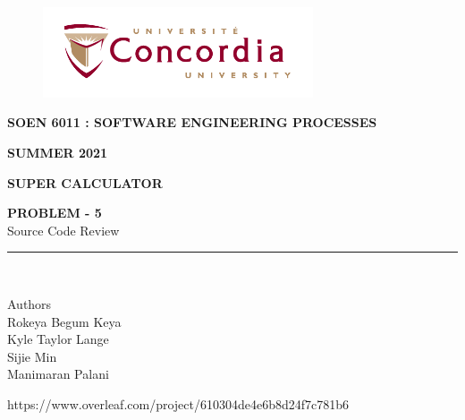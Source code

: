 \documentclass[letterpaper, 11pt]{report}
\begin{document}
\begin{titlepage}
\vspace*{0.7in}
\begin{center}
\begin{figure}[htb]
\begin{center}
\includegraphics[width=8cm]{univ_logo}
\end{center}
\end{figure}
\vspace*{0.3in}
\begin{Large}
\textbf{SOEN 6011 : SOFTWARE ENGINEERING PROCESSES} \\
\end{Large}
\vspace*{0.1in}
\begin{Large}
\textbf{SUMMER 2021} \\
\end{Large}
\vspace*{0.9in}
\begin{Large}
\textbf{SUPER CALCULATOR} \\
\end{Large}
\vspace*{0.9in}
\begin{Large} 


\textbf{PROBLEM - 5} \\
 Source Code Review\\
\end{Large}
\vspace*{0.625in}
\rule{80mm}{0.1mm}\\
\vspace*{0.1in}
\begin{large}
Authors \\
\vspace*{0.1in}
Rokeya Begum Keya\\
\vspace*{0.1in}
Kyle Taylor Lange\\
\vspace*{0.1in}
Sijie Min\\
\vspace*{0.1in}
Manimaran Palani\\ 
\vspace*{0.3in}
\date{\normalsize\today} 
\end{large}
\end{center}
\begin{center}
https://www.overleaf.com/project/610304de4e6b8d24f7c781b6\end{center}
\end{titlepage}
\tableofcontents
\newpage
\end{document}
